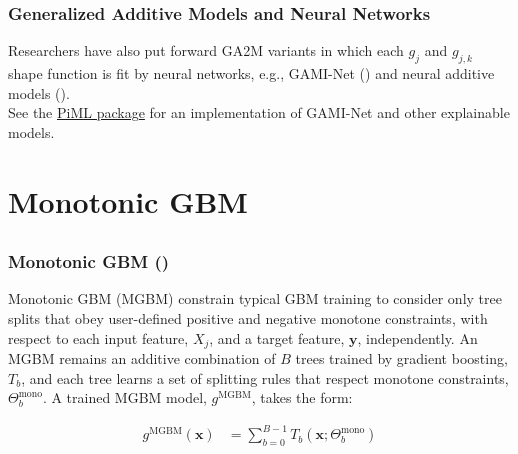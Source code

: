 \documentclass[11pt,aspectratio=169,hyperref={colorlinks}]{beamer}
\begin{document}
	\begin{frame}
	
		\frametitle{Generalized Additive Models and Neural Networks}
		
		\noindent Researchers have also put forward GA2M variants in which each $g_{j}$ and $g_{j, k}$ shape function is fit by neural networks, e.g., GAMI-Net (\citet{yang2021gami}) and neural additive models (\citet{agarwal2021neural}).\\
		\vspace{10pt} 
		\noindent See the \href{https://selfexplainml.github.io/PiML-Toolbox/_build/html/index.html}{PiML package} for an implementation of GAMI-Net and other explainable models. 
		 
	\end{frame}


	\section{Monotonic GBM}

	\subsection*{}
	
	\begin{frame}
	
		\frametitle{Monotonic GBM (\cite{rml_workflow})}

			Monotonic GBM (MGBM) constrain typical GBM training to consider only tree splits that obey user-defined positive and negative monotone constraints, with respect to each input feature, $X_j$, and a target feature, $\mathbf{y}$, independently. An MGBM remains an additive combination of $B$ trees trained by gradient boosting, $T_b$, and each tree learns a set of splitting rules that respect monotone constraints,  $\Theta^\text{mono}_b$. A trained MGBM model, $g^{\text{MGBM}}$, takes the form:
			
			\begin{equation}
			\begin{aligned}\label{eq:gbm}
			g^{\text{MGBM}}(\mathbf{x}) &= \sum_{b=0}^{B-1} T_b\left(\mathbf{x}; \Theta^\text{mono}_b\right)
			\end{aligned}
			\end{equation}
		
	\end{frame}
\end{document}
